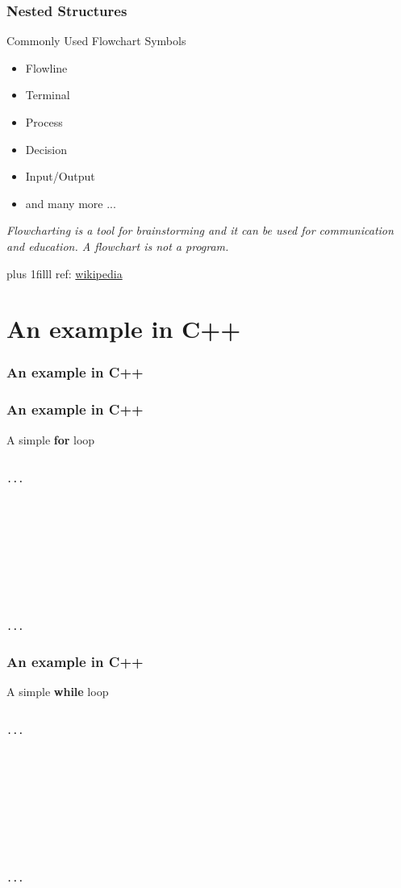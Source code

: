 \documentclass[fleqn]{beamer} %
\newcommand{\sectiontitleIV}{Nested Structures}
\newcommand{\sectiontitleV}{An example in C++}
\newcommand{\btVFill}{\vskip0pt plus 1filll}
\begin{document}
	\begin{frame}[label=sectionIV,containsverbatim] \small
	\frametitle{\sectiontitleIV}    
	
	Commonly Used Flowchart Symbols
	
	\begin{itemize}
		\item Flowline
		\item Terminal
		\item Process
		\item Decision
		\item Input/Output
		\item and many more ... 
		
	\end{itemize}

	{\it Flowcharting is a tool for brainstorming and it can be used for communication and education. A flowchart is not a program. }
	
	
	\btVFill
	\tiny{ref: \href{https://en.wikipedia.org/wiki/Flowchart}{wikipedia}} 
\end{frame}

\section{\sectiontitleV}	
	\begin{frame}[label=sectionV,containsverbatim] \small
	\frametitle{\sectiontitleV}    
	

\end{frame}

	\begin{frame}[label=sectionV,containsverbatim] \small
	\frametitle{\sectiontitleV}    
A simple {\bf for} loop	
	
\begin{lstlisting}

...










...			

\end{lstlisting}

	\end{frame}

\begin{frame}[label=sectionV,containsverbatim] \small
\frametitle{\sectiontitleV}    

A simple {\bf while} loop	

\begin{lstlisting}

...










...			

\end{lstlisting}

\end{frame}
\end{document}
